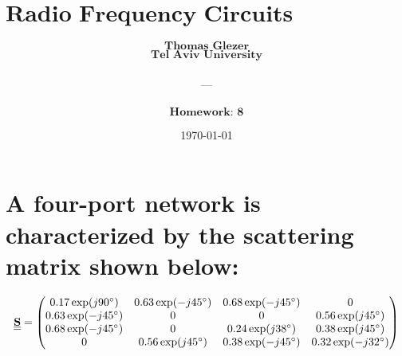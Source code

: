 \documentclass[12pt, letterpaper]{article}
\title{
  \Large $\textbf{Radio Frequency Circuits \& Antenna}$
}
\author{
  $\textbf{Thomas Glezer}$\\
  $\textbf{Tel Aviv University}$\\\\
  ---\\\\
  $\textbf{Homework: 8}$\\
}
\date{\today}
\begin{document}
\begin{titlingpage}
  \maketitle
\end{titlingpage}

\section{A four-port network is characterized by the scattering matrix shown below:}

\begin{align}
  \underline{\underline{\vb{S}}}=
  \begin{pmatrix}
    0.17\exp(j90^{\circ}) & 0.63\exp(-j45^{\circ}) & 0.68\exp(-j45^{\circ}) & 0 \\
    0.63\exp(-j45^{\circ}) & 0 & 0 & 0.56\exp(j45^{\circ})\\
    0.68\exp(-j45^{\circ}) & 0 & 0.24\exp(j38^{\circ}) & 0.38\exp(j45^{\circ})\\
    0 & 0.56\exp(j45^{\circ}) & 0.38\exp(-j45^{\circ}) & 0.32\exp(-j32^{\circ})
  \end{pmatrix}
\end{align}
\end{document}
